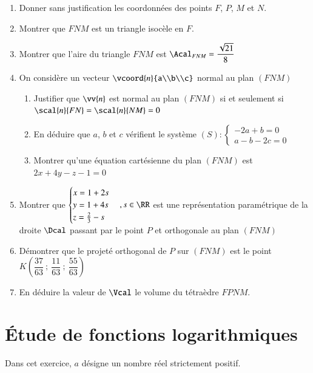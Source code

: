 \documentclass[oneside,12pt]{article}
\let\oldsection\section
\renewcommand{\section}{\newpage\oldsection}
\begin{document}
\begin{enumerate}
    \item Donner sans justification les coordonnées des points $F$, $P$, $M$ et $N$.
    \item Montrer que $FNM$ est un triangle isocèle en $F$.
    \item Montrer que l'aire du triangle $FNM$ est $\Acal_{FNM}=\dfrac{\sqrt{21}}{8}$
    \item On considère un vecteur $\vcoord{n}{a\\b\\c}$ normal au plan $(FNM)$
    \begin{enumerate}
        \item Justifier que $\vv{n}$ est normal au plan $(FNM)$ si et seulement si $\scal{n}{FN}=\scal{n}{NM}=0$
        \item En déduire que $a$, $b$ et $c$ vérifient le système $(S):\begin{cases}-2a+b=0\\a-b-2c=0\end{cases}$
        \item Montrer qu'une équation cartésienne du plan $(FNM)$ est $2x+4y-z-1=0$
    \end{enumerate}
    \item Montrer que $\begin{cases} x=1+2s \\ y=1+4s \\ z=\frac{2}{3}-s \end{cases},s\in\RR$ est une représentation paramétrique de la droite $\Dcal$ passant par le point $P$ et orthogonale au plan $(FNM)$
    \item Démontrer que le projeté orthogonal de $P$ sur $(FNM)$ est le point $K\left(\dfrac{37}{63}~;~\dfrac{11}{63}~;~\dfrac{55}{63}\right)$
    \item En déduire la valeur de $\Vcal$ le volume du tétraèdre $FPNM$.
\end{enumerate}

\vspace{45mm}

\begin{center}
\end{center}





\section{Étude de fonctions logarithmiques}
Dans cet exercice, $a$ désigne un nombre réel strictement positif.
\end{document}
